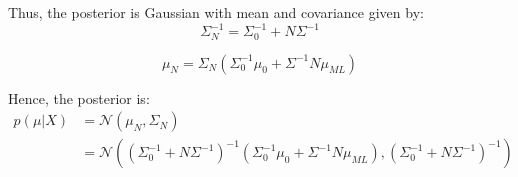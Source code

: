 \documentclass[a4paper,12pt]{article}
\begin{document}
Thus, the posterior is Gaussian with mean and covariance given by:
\begin{equation*}
	\Sigma_N^{-1} = \Sigma_0^{-1} + N\Sigma^{-1}
\end{equation*}

\begin{equation*}
	\mu_N = \Sigma_N (\Sigma_0^{-1}\mu_0 + \Sigma^{-1}N\mu_{ML})
\end{equation*}

Hence, the posterior is:
\begin{align*}
	p(\mu|X) &= \mathcal{N}(\mu_N, \Sigma_N) \\
	&= \mathcal{N}\left((\Sigma_0^{-1} + N\Sigma^{-1})^{-1}(\Sigma_0^{-1}\mu_0 + \Sigma^{-1}N\mu_{ML}), (\Sigma_0^{-1} + N\Sigma^{-1})^{-1}\right)
\end{align*}
\end{document}
